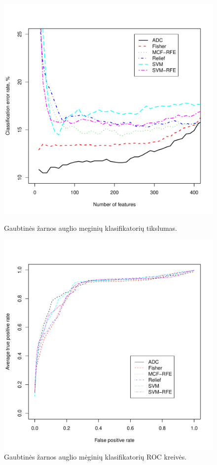 \begin{figure}[!htb]
\begin{minipage}[b]{0.5\linewidth}
\centering
\includegraphics[width=\textwidth]{../bachelor/images/nncolon_classification.pdf}
\caption{Gaubtinės žarnos auglio meginių klasifikatorių tikslumas.}
\label{fig:class_colon}
\end{minipage}
\hspace{0.1cm}
\begin{minipage}[b]{0.5\linewidth}
\centering
\includegraphics[width=\textwidth]{../bachelor/images/nncolon_roc.pdf}
\caption{Gaubtinės žarnos auglio mėginių klasifikatorių ROC kreivės.}
\label{fig:roc_colon}
\end{minipage}
\end{figure}

